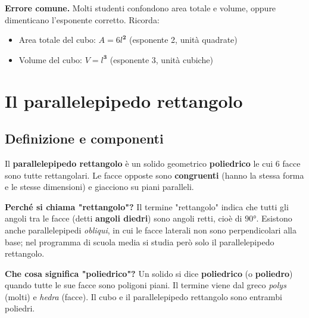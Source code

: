 \begin{attenzione}
    \textbf{Errore comune.} Molti studenti confondono area totale e volume, oppure dimenticano l'esponente corretto. Ricorda:
    \begin{itemize}[leftmargin=1.4em]
        \item Area totale del cubo: $A = 6l^{\mathbf{2}}$ \quad (esponente 2, unità quadrate)
        \item Volume del cubo: $V = l^{\mathbf{3}}$ \quad (esponente 3, unità cubiche)
    \end{itemize}
\end{attenzione}

\section{Il parallelepipedo rettangolo}

\subsection{Definizione e componenti}

\begin{definizione}
    Il \textbf{parallelepipedo rettangolo} è un solido geometrico \textbf{poliedrico} le cui 6 facce sono tutte rettangolari. Le facce opposte sono \textbf{congruenti} (hanno la stessa forma e le stesse dimensioni) e giacciono su piani paralleli.
\end{definizione}

\medskip
\textbf{Perché si chiama "rettangolo"?} Il termine "rettangolo" indica che tutti gli angoli tra le facce (detti \textbf{angoli diedri}) sono angoli retti, cioè di $90°$. Esistono anche parallelepipedi \emph{obliqui}, in cui le facce laterali non sono perpendicolari alla base; nel programma di scuola media si studia però solo il parallelepipedo rettangolo.

\medskip
\textbf{Che cosa significa "poliedrico"?} Un solido si dice \textbf{poliedrico} (o \textbf{poliedro}) quando tutte le sue facce sono poligoni piani. Il termine viene dal greco \emph{polys} (molti) e \emph{hedra} (facce). Il cubo e il parallelepipedo rettangolo sono entrambi poliedri.

